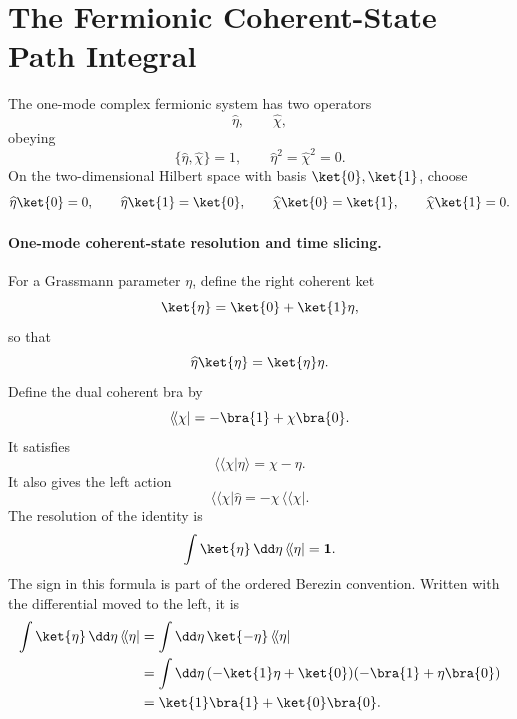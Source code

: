 \section{The Fermionic Coherent-State Path Integral}

The one-mode complex fermionic system has two operators
\[
  \widehat\eta,\qquad \widehat\chi,
\]
obeying
\[
  \{\widehat\eta,\widehat\chi\}=1,
  \qquad
  \widehat\eta^2=\widehat\chi^2=0.
\]
On the two-dimensional Hilbert space with basis \(\ket{0},\ket{1}\), choose
\[
  \widehat\eta\ket{0}=0,\qquad
  \widehat\eta\ket{1}=\ket{0},
  \qquad
  \widehat\chi\ket{0}=\ket{1},\qquad
  \widehat\chi\ket{1}=0.
\]

\paragraph{One-mode coherent-state resolution and time slicing.}
\begin{center}
\end{center}

For a Grassmann parameter \(\eta\), define the right coherent ket
\[
  \ket{\eta}=\ket{0}+\ket{1}\eta ,
\]
so that
\[
  \widehat\eta\ket{\eta}=\ket{\eta}\eta .
\]
Define the dual coherent bra by
\[
  \langle\!\langle\chi|
  =
  -\bra{1}+\chi\bra{0}.
\]
It satisfies
\[
  \langle\!\langle\chi|\eta\rangle=\chi-\eta .
\]
It also gives the left action
\[
  \langle\!\langle\chi|\widehat\eta
  =
  -\chi\,\langle\!\langle\chi| .
\]
The resolution of the identity is
\[
  \int\ket{\eta}\,\dd\eta\,\langle\!\langle\eta|
  =
  \mathbf 1 .
\]
The sign in this formula is part of the ordered Berezin convention. Written
with the differential moved to the left, it is
\[
\begin{aligned}
  \int\ket{\eta}\,\dd\eta\,\langle\!\langle\eta|
  &=
  \int\dd\eta\,\ket{-\eta}\,\langle\!\langle\eta|       \\
  &=
  \int\dd\eta\,
  (-\ket{1}\eta+\ket{0})(-\bra{1}+\eta\bra{0})          \\
  &=
  \ket{1}\bra{1}+\ket{0}\bra{0}.
\end{aligned}
\]

